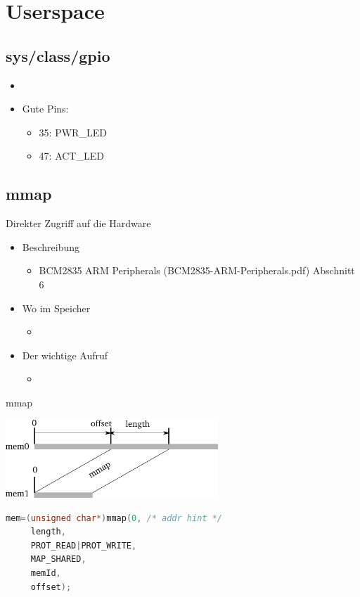 \section{Userspace}
\subsection{sys/class/gpio}
\begin{frame}{}
 \begin{itemize}
  \item {}
  \item Gute Pins:
   \begin{itemize}
    \item 35: PWR\_LED
    \item 47: ACT\_LED
   \end{itemize}
 \end{itemize}
\end{frame}

\subsection{mmap}
\begin{frame}{}{Direkter Zugriff auf die Hardware}
 \begin{itemize}
  \item Beschreibung
   \begin{itemize}
    \item BCM2835 ARM Peripherals (BCM2835-ARM-Peripherals.pdf) Abschnitt 6
   \end{itemize}
  \item Wo im Speicher
   \begin{itemize}
    \item {}
   \end{itemize}
 \item Der wichtige Aufruf
  \begin{itemize}
   \item {}
  \end{itemize}
 \end{itemize}
\end{frame}

\begin{frame}[fragile]{mmap}
\begin{center}
 \includegraphics[width=8cm]{mmap.pdf}
\end{center}
\begin{lstlisting}[language=C]
 mem=(unsigned char*)mmap(0, /* addr hint */
     length,
     PROT_READ|PROT_WRITE,
     MAP_SHARED, 
     memId,
     offset);
\end{lstlisting}
\end{frame}

